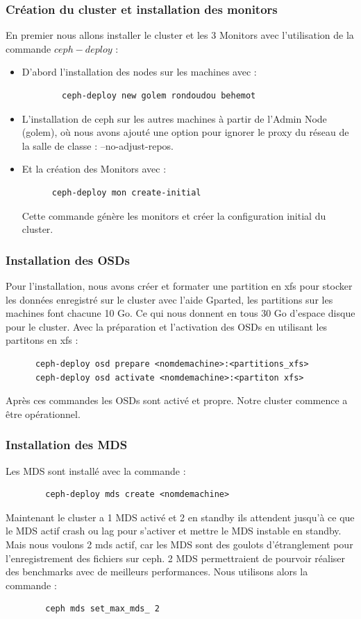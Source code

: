 \documentclass[12pt]{article}
\begin{document}
	\subsubsection{Création du cluster et installation des monitors }
	  En premier nous allons installer le cluster et les 3 Monitors avec l'utilisation de la commande $ceph-deploy$ :
	  \begin{itemize}
	  \item D'abord l'installation des nodes sur les machines avec :
	  \begin{verbatim}
	  	ceph-deploy new golem rondoudou behemot
	  \end{verbatim}
	  \item L'installation de ceph sur les autres machines à partir de l'Admin Node (golem), où nous avons ajouté une option pour ignorer le proxy du réseau de la salle de classe : --no-adjust-repos.
	  \item Et la création des Monitors  avec :
	  \begin{verbatim}
	  ceph-deploy mon create-initial
	  \end{verbatim}
	  Cette commande génère les monitors et créer la configuration initial du cluster.
	  \end{itemize}
	  
	  \subsubsection{Installation des OSDs}
	  Pour l'installation, nous avons créer et formater une partition en xfs pour stocker les données enregistré sur le cluster avec l'aide Gparted, les partitions sur les machines font chacune 10 Go. Ce qui nous donnent en tous 30 Go d'espace disque pour le cluster.
	 Avec la préparation et l'activation des OSDs en utilisant les partitons en xfs :
	  \begin{verbatim}
	  ceph-deploy osd prepare <nomdemachine>:<partitions_xfs>
	  ceph-deploy osd activate <nomdemachine>:<partiton xfs>
	  \end{verbatim}
	  
	  Après ces commandes les OSDs sont activé et propre. Notre cluster commence a être opérationnel.
	  
	  \subsubsection{Installation des MDS}
	  	Les MDS sont installé avec la commande :
	  	\begin{verbatim}
	  	ceph-deploy mds create <nomdemachine>
	  	\end{verbatim}
	  	Maintenant le cluster a 1 MDS activé et 2 en standby ils attendent jusqu'à ce que le MDS actif crash ou lag pour s'activer et mettre le MDS instable en standby.
	  	Mais nous voulons 2 mds actif, car les MDS sont des goulots d'étranglement pour l'enregistrement des fichiers sur ceph. 2 MDS permettraient de pourvoir réaliser des benchmarks avec de meilleurs performances.
	  	Nous utilisons alors la commande :
	  	\begin{verbatim}
	  	ceph mds set_max_mds_ 2
	  	\end{verbatim}
	  	
\end{document}
